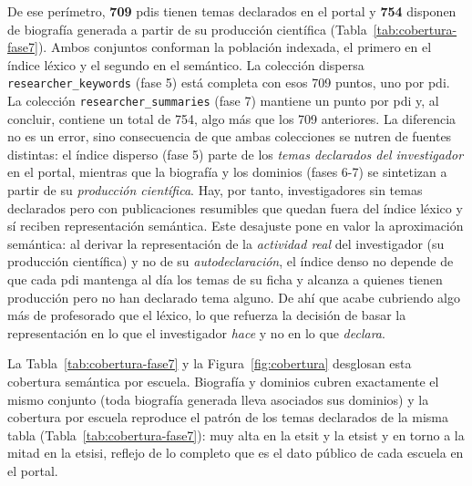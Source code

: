 De ese perímetro, \textbf{709} \glspl{pdi} tienen temas declarados en el portal y \textbf{754} disponen de biografía generada a partir de su producción científica (Tabla~\ref{tab:cobertura-fase7}).
Ambos conjuntos conforman la población indexada, el primero en el índice léxico y el segundo en el semántico.
La colección dispersa \texttt{researcher\_\allowbreak keywords} (fase 5) está completa con esos 709 puntos, uno por \gls{pdi}.
La colección \texttt{researcher\_\allowbreak summaries} (fase 7) mantiene un punto por \gls{pdi} y, al concluir, contiene un total de 754, algo más que los 709 anteriores.
La diferencia no es un error, sino consecuencia de que ambas colecciones se nutren de fuentes distintas: el índice disperso (fase 5) parte de los \emph{temas declarados del investigador} en el portal, mientras que la biografía y los dominios (fases 6-7) se sintetizan a partir de su \emph{producción científica}.
Hay, por tanto, investigadores sin temas declarados pero con publicaciones resumibles que quedan fuera del índice léxico y sí reciben representación semántica.
Este desajuste pone en valor la aproximación semántica: al derivar la representación de la \emph{actividad real} del investigador (su producción científica) y no de su \emph{autodeclaración}, el índice denso no depende de que cada \gls{pdi} mantenga al día los temas de su ficha y alcanza a quienes tienen producción pero no han declarado tema alguno.
De ahí que acabe cubriendo algo más de profesorado que el léxico, lo que refuerza la decisión de basar la representación en lo que el investigador \emph{hace} y no en lo que \emph{declara}.

La Tabla~\ref{tab:cobertura-fase7} y la Figura~\ref{fig:cobertura} desglosan esta cobertura semántica por escuela.
Biografía y dominios cubren exactamente el mismo conjunto (toda biografía generada lleva asociados sus dominios) y la cobertura por escuela reproduce el patrón de los temas declarados de la misma tabla (Tabla~\ref{tab:cobertura-fase7}): muy alta en la \gls{etsit} y la \gls{etsist} y en torno a la mitad en la \gls{etsisi}, reflejo de lo completo que es el dato público de cada escuela en el portal.

